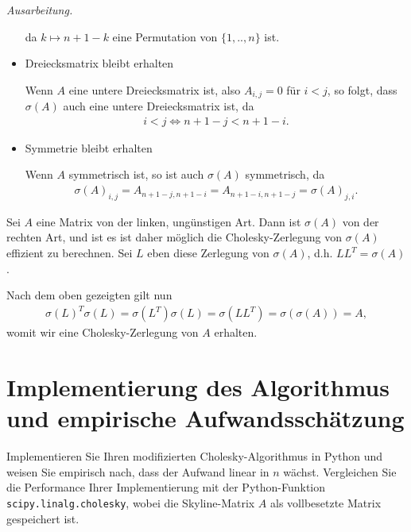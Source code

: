 \documentclass[titlepage]{article}
\newenvironment{ausarbeitung}{\vspace{3mm}\noindent\textit{Ausarbeitung.}}{}
\begin{document}
\begin{ausarbeitung}
\begin{itemize}
			da $k \mapsto n+1-k$ eine Permutation von $\{1, .., n\}$ ist.
		\item Dreiecksmatrix bleibt erhalten
		
		Wenn $A$ eine untere Dreiecksmatrix ist, also $A_{i,j} = 0$ für $i < j$, so folgt, dass $\sigma(A)$ auch eine untere Dreiecksmatrix ist, da 
		\begin{align*}
			i < j \iff n+1-j < n+1-i.
		\end{align*}
		
		\item Symmetrie bleibt erhalten
		
		Wenn $A$ symmetrisch ist, so ist auch $\sigma(A)$ symmetrisch, da 
		\begin{align*}
			\sigma(A)_{i,j} = A_{n+1-j,n+1-i} = A_{n+1-i,n+1-j} = \sigma(A)_{j,i}.
		\end{align*}
	\end{itemize}

	Sei $A$ eine Matrix von der linken, ungünstigen Art. Dann ist $\sigma(A)$ von der rechten Art, und ist es ist daher möglich die Cholesky-Zerlegung von $\sigma(A)$ effizient zu berechnen. Sei $L$ eben diese Zerlegung von $\sigma(A)$, d.h. $LL^T=\sigma(A)$.
	
	Nach dem oben gezeigten gilt nun
	\begin{align*}
		\sigma(L)^T\sigma(L) = \sigma(L^T)\sigma(L) = \sigma(LL^T) = \sigma(\sigma(A)) = A,
	\end{align*}
	womit wir eine Cholesky-Zerlegung von $A$ erhalten.
\end{ausarbeitung}
\newpage



\section{Implementierung des Algorithmus und empirische Aufwandsschätzung}
Implementieren Sie Ihren modifizierten Cholesky-Algorithmus in Python und weisen Sie empirisch nach, dass der Aufwand linear in $n$ wächst. Vergleichen Sie die Performance Ihrer Implementierung mit der Python-Funktion \texttt{scipy.linalg.cholesky}, wobei die Skyline-Matrix $A$ als vollbesetzte Matrix gespeichert ist.
\end{document}
